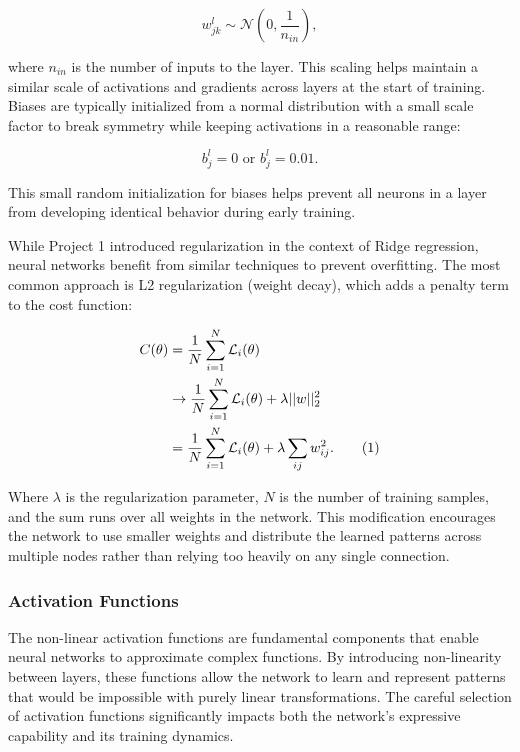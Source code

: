 \documentclass[aps,pra,english,notitlepage,reprint,nofootinbib]{revtex4-1}  %
\newcommand\numberthis{\addtocounter{equation}{1}\tag{\theequation}}
\begin{document}
\begin{equation}
    w_{jk}^l \sim \mathcal{N}\left(0, \frac{1}{n_{in}}\right),
\end{equation}

where $n_{in}$ is the number of inputs to the layer. This scaling helps maintain a similar scale of activations and gradients across layers at the start of training.  Biases are typically initialized from a normal distribution with a small scale factor to break symmetry while keeping activations in a reasonable range:

\begin{equation}
    b_j^l = 0 \text{ or } b_j^l = 0.01.
\end{equation}

This small random initialization for biases helps prevent all neurons in a layer from developing identical behavior during early training.

While Project 1 introduced regularization in the context of Ridge regression, neural networks benefit from similar techniques to prevent overfitting. The most common approach is L2 regularization (weight decay), which adds a penalty term to the cost function:

\begin{align*}
    C(\theta) &= \frac{1}{N} \sum_{i=1}^{N} \mathcal{L}_i(\theta) \\
    &\rightarrow \frac{1}{N} \sum_{i=1}^{N} \mathcal{L}_i(\theta) + \lambda||w||_2^2 \\
    &= \frac{1}{N} \sum_{i=1}^{N} \mathcal{L}_i(\theta) + \lambda \sum_{ij}w_{ij}^2. \numberthis \label{reg}
\end{align*}

Where $\lambda$ is the regularization parameter, $N$ is the number of training samples, and the sum runs over all weights in the network. This modification encourages the network to use smaller weights and distribute the learned patterns across multiple nodes rather than relying too heavily on any single connection.

\subsubsection{Activation Functions}

The non-linear activation functions are fundamental components that enable neural networks to approximate complex functions. By introducing non-linearity between layers, these functions allow the network to learn and represent patterns that would be impossible with purely linear transformations. The careful selection of activation functions significantly impacts both the network's expressive capability and its training dynamics. 
\end{document}
